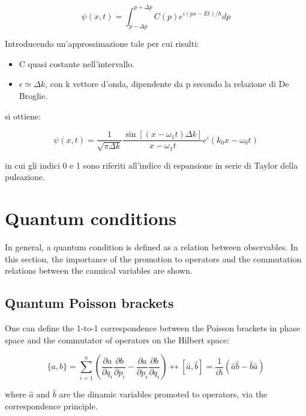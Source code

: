 \documentclass{report}
\begin{document}
\begin{equation}
  \psi(x,t)=\int_{p-\Delta p}^{p+\Delta p} C(p)e^{i(px-Et)/\hbar}dp
\end{equation}

Introducendo un'approssimazione tale per cui risulti:

\begin{itemize}
  \item C quasi costante nell'intervallo.
  \item $\epsilon \simeq \Delta k$, con k vettore d'onda, dipendente da p secondo la relazione di De Broglie.
\end{itemize}

si ottiene:

\begin{equation}
  \psi(x,t)= \frac{1}{\sqrt{\pi \Delta k}}\frac{\sin[(x-\omega_1 t)\Delta k]}{x-\omega_1 t}e^i(k_0x-\omega_0t)
\end{equation}

in cui gli indici 0 e 1 sono riferiti all'indice di espansione in serie di Taylor della pulsazione.

\section{Quantum conditions}

In general, a quantum condition is defined as a relation between observables.
In this section, the importance of the promotion to operators and the commutation relations between the cannical variables are shown.

\subsection{Quantum Poisson brackets}

One can define the 1-to-1 correspondence between the Poisson brackets in phase space and the commutator of operators on the Hilbert space:

\begin{tcolorbox}[colframe=gray!50, colback=gray!10, coltitle=black, title=Quantum Poisson Brackets]

  \begin{equation}
    \{a, b\} = \sum_{i=1}^{n} \left( \frac{\partial a}{\partial q_i} \frac{\partial b}{\partial p_i} - \frac{\partial a}{\partial p_i} \frac{\partial b}{\partial q_i} \right)
    \longleftrightarrow
    [\hat{a}, \hat{b}] = \frac{1}{i\hbar}(\hat{a}\hat{b} - \hat{b}\hat{a})
  \end{equation}

  where $\hat{a}$ and $\hat{b}$ are the dinamic variables promoted to operators, via the correspondence principle.

\end{tcolorbox}
\end{document}

